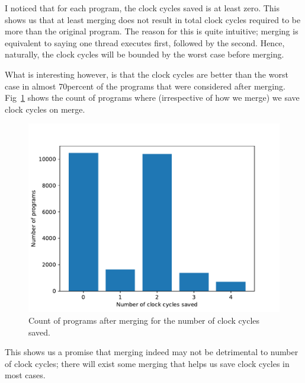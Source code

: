     I noticed that for each program, the clock cycles saved is at least zero.
    This shows us that at least merging does not result in total clock cycles required to be more than the original program. 
    The reason for this is quite intuitive; merging is equivalent to saying one thread executes first, followed by the second.
    Hence, naturally, the clock cycles will be bounded by the worst case before merging. 

    What is interesting however, is that the clock cycles are better than the worst case in almost 70percent of the programs that were considered after merging. 
    Fig~\ref{Fig2} shows the count of programs where (irrespective of how we merge) we save clock cycles on merge.  
    
        \begin{figure}
            \centering
            \includegraphics[scale=0.5]{clk_count.pdf}
            \caption{Count of programs after merging for the number of clock cycles saved.}
            \label{Fig2}
        \end{figure}
    
    
    This shows us a promise that merging indeed may not be detrimental to number of clock cycles; there will exist some merging that helps us save clock cycles in most cases.

